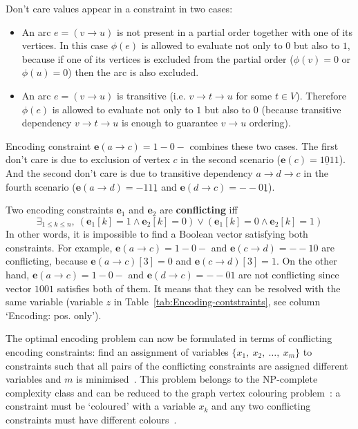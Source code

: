 Don't care values appear in a constraint in two cases:
\begin{itemize}
\item An arc $e=(v\rightarrow u)$ is not present in a partial order together
with one of its vertices. In this case $\phi(e)$ is allowed to evaluate
not only to $0$ but also to $1$, because if one of its vertices
is excluded from the partial order ($\phi(v)=0$ or $\phi(u)=0$)
then the arc is also excluded.
\item An arc $e=(v\rightarrow u)$ is transitive (i.e. $v\rightarrow t\rightarrow u$
for some $t\in V$). Therefore $\phi(e)$ is allowed to evaluate not
only to $1$ but also to $0$ (because transitive dependency $v\rightarrow t\rightarrow u$
is enough to guarantee $v\rightarrow u$ ordering).
\end{itemize}
Encoding constraint $\mathbf{e}(a\rightarrow c)=1\!-\!0-$ combines
these two cases. The first don't care is due to exclusion of vertex
$c$ in the second scenario ($\mathbf{e}(c)=1\underline{0}11$). And
the second don't care is due to transitive dependency $a\rightarrow d\rightarrow c$
in the fourth scenario ($\mathbf{e}(a\rightarrow d)=-11\underline{1}$
and $\mathbf{e}(d\rightarrow c)=-\!-0\underline{1}$).

Two encoding constraints $\mathbf{e}_{1}$ and $\mathbf{e}_{2}$ are
\textbf{conflicting} iff
\[
\exists_{1\le k\le n},\ (\mathbf{e}_{1}[k]=1\wedge\mathbf{e}_{2}[k]=0)\vee(\mathbf{e}_{1}[k]=0\wedge\mathbf{e}_{2}[k]=1)
\]
In other words, it is impossible to find a Boolean vector satisfying
both constraints. For example, $\mathbf{e}(a\rightarrow c)=1\!-\!0-$
and $\mathbf{e}(c\rightarrow d)=-\!-\!10$ are conflicting, because
$\mathbf{e}(a\rightarrow c)[3]=0$ and $\mathbf{e}(c\rightarrow d)[3]=1$.
On the other hand, $\mathbf{e}(a\rightarrow c)=1\!-\!0-$ and $\mathbf{e}(d\rightarrow c)=-\!-\!01$
are not conflicting since vector $1001$ satisfies both of them. It
means that they can be resolved with the same variable (variable $z$
in Table~\ref{tab:Encoding-contstraints}, see column `Encoding:
pos. only').

The optimal encoding problem can now be formulated in terms of conflicting
encoding constraints: find an assignment of variables $\{x_{1},\ x_{2},\ \dots,\ x_{m}\}$
to constraints such that all pairs of the conflicting constraints
are assigned different variables and $m$ is minimised~\cite{2009_mokhov_phd}.
This problem belongs to the NP-complete complexity class and can be
reduced to the graph vertex colouring problem~\cite{2001_cormen_mit}:
a constraint must be `coloured' with a variable $x_{k}$ and any
two conflicting constraints must have different colours~\cite{2009_mokhov_phd}.

